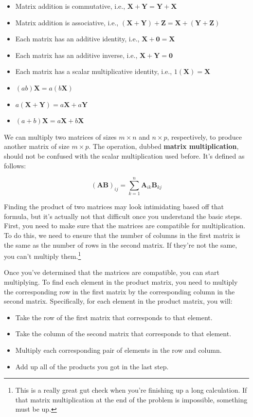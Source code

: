\documentclass[
  letterpaper,
  DIV=11,
  numbers=noendperiod]{scrreprt}
\providecommand{\tightlist}{%
  \setlength{\itemsep}{0pt}\setlength{\parskip}{0pt}}\usepackage{longtable,booktabs,array}
\begin{document}
\begin{itemize}
\tightlist
\item
  Matrix addition is commutative, i.e.,
  \(\textbf{X} + \textbf{Y} = \textbf{Y} + \textbf{X}\)
\item
  Matrix addition is associative, i.e.,
  \((\textbf{X} + \textbf{Y}) + \textbf{Z} = \textbf{X} + (\textbf{Y} + \textbf{Z})\)
\item
  Each matrix has an additive identity, i.e.,
  \(\textbf{X} + \textbf{0} = \textbf{X}\)
\item
  Each matrix has an additive inverse, i.e.,
  \(\textbf{X} + \textbf{Y} = \textbf{0}\)
\item
  Each matrix has a scalar multiplicative identity, i.e.,
  \(1 (\textbf{X}) = \textbf{X}\)
\item
  \((ab)\textbf{X} = a(b\textbf{X})\)
\item
  \(a(\textbf{X} + \textbf{Y}) = a\textbf{X} + a\textbf{Y}\)
\item
  \((a+b)\textbf{X} = a\textbf{X} + b\textbf{X}\)
\end{itemize}

We can multiply two matrices of sizes \(m\times n\) and \(n\times p\),
respectively, to produce another matrix of size \(m\times p\). The
operation, dubbed \textbf{matrix multiplication}, should not be confused
with the scalar multiplication used before. It's defined as follows:

\[(\textbf{AB})_{ij} = \sum_{k=1}^n \textbf{A}_{ik} \textbf{B}_{kj}\]

Finding the product of two matrices may look intimidating based off that
formula, but it's actually not that difficult once you understand the
basic steps. First, you need to make sure that the matrices are
compatible for multiplication. To do this, we need to ensure that the
number of columns in the first matrix is the same as the number of rows
in the second matrix. If they're not the same, you can't multiply
them.\footnote{This is a really great gut check when you're finishing up
  a long calculation. If that matrix multiplication at the end of the
  problem is impossible, something must be up.}

Once you've determined that the matrices are compatible, you can start
multiplying. To find each element in the product matrix, you need to
multiply the corresponding row in the first matrix by the corresponding
column in the second matrix. Specifically, for each element in the
product matrix, you will:

\begin{itemize}
\tightlist
\item
  Take the row of the first matrix that corresponds to that element.
\item
  Take the column of the second matrix that corresponds to that element.
\item
  Multiply each corresponding pair of elements in the row and column.
\item
  Add up all of the products you got in the last step.
\end{itemize}
\end{document}
